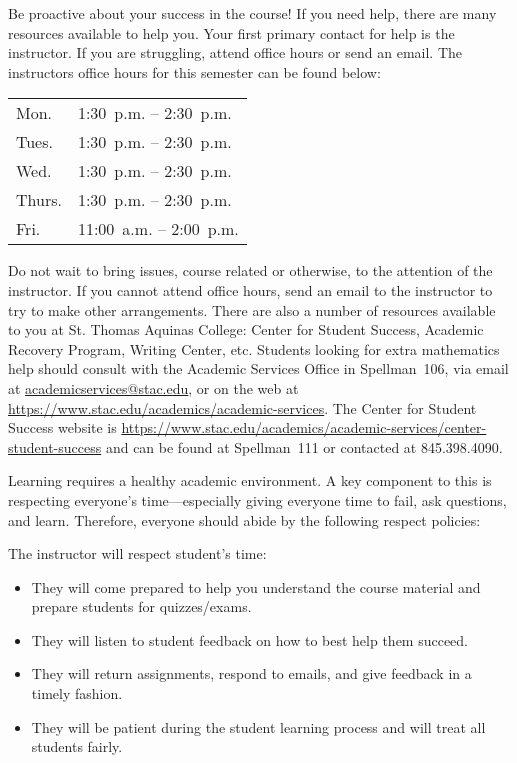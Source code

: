 \documentclass[11pt,letterpaper]{article}
\begin{document}
Be proactive about your success in the course! If you need help, there are many resources available to help you. Your first primary contact for help is the instructor. If you are struggling, attend office hours or send an email. The instructors office hours for this semester can be found below:
	\begin{table}[!ht]
	\centering
	\begin{tabular}{l || l}
	Mon. & 1:30~p.m. -- 2:30~p.m. \\
	Tues. & 1:30~p.m. -- 2:30~p.m. \\
	Wed. & 1:30~p.m. -- 2:30~p.m. \\
	Thurs. & 1:30~p.m. -- 2:30~p.m. \\
	Fri. & 11:00~a.m. -- 2:00~p.m.
	\end{tabular}
	\end{table} \par
Do not wait to bring issues, course related or otherwise, to the attention of the instructor. If you cannot attend office hours, send an email to the instructor to try to make other arrangements. There are also a number of resources available to you at St. Thomas Aquinas College: Center for Student Success, Academic Recovery Program, Writing Center, etc. Students looking for extra mathematics help should consult with the Academic Services Office in Spellman~106, via email at \href{mailto:AcademicServices@stac.edu}{academicservices@stac.edu}, or on the web at \href{https://www.stac.edu/academics/academic-services}{https://www.stac.edu/academics/academic-services}. The Center for Student Success website is \url{https://www.stac.edu/academics/academic-services/center-student-success} and can be found at Spellman~111 or contacted at 845.398.4090.
\sectionbreak



Learning requires a healthy academic environment. A key component to this is respecting everyone's time---especially giving everyone time to fail, ask questions, and learn. Therefore, everyone should abide by the following respect policies: 





\newpage





The instructor will respect student's time:
	\begin{itemize}
	\item They will come prepared to help you understand the course material and prepare students for quizzes/exams. 
	\item They will listen to student feedback on how to best help them succeed. 
	\item They will return assignments, respond to emails, and give feedback in a timely fashion. 
	\item They will be patient during the student learning process and will treat all students fairly. 
	\end{itemize} \pspace
\end{document}
